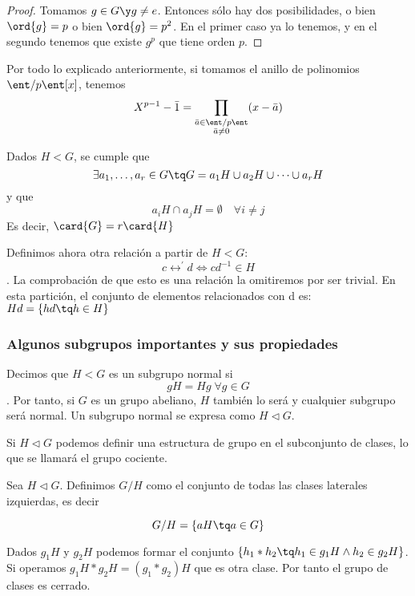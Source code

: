 \documentclass[nochap]{apuntes}
\begin{document}
  \begin{proof}
   Tomamos $g\in G \y g\neq e$. Entonces sólo hay dos posibilidades, o bien $\ord{g}=p$ o bien $\ord{g}=p^{2}$. En el primer caso ya lo tenemos, y en el segundo tenemos que existe $g^p$ que tiene orden $p$.
  \end{proof}

  \begin{example}
   Por todo lo explicado anteriormente, si tomamos el anillo de polinomios $\ent/p\ent[x]$, tenemos \[ X^{p-1}-\bar{1}=
   \prod_{\substack{\bar{a}\in\ent/p\ent \\ \bar{a}\neq 0}}(x-\bar{a}) \]
  \end{example}

  \begin{theorem}
   Dados $H<G$,  se cumple que \[ \exists a_{1},\dotsc,a_{r}\in G\tq G=a_{1}H \cup a_{2}H \cup \dotsb \cup a_{r}H\] y que \[ a_{i}H\cap a_{j}H=\emptyset \quad \forall i\neq j\]
   Es decir, $\card{G}=r\card{H}$
  \end{theorem}

  Definimos ahora otra relación a partir de $H<G$: \[ c\rel^{'}d \Leftrightarrow cd^{-1}\in H \]. La comprobación de que esto es una relación
  la omitiremos por ser trivial. En esta partición, el conjunto de elementos relacionados con d es: $Hd=\{hd\tq h\in H\}$

\subsubsection{Algunos subgrupos importantes y sus propiedades}
  \begin{defn}
   Decimos que $H<G$  es un subgrupo normal si \[ gH=Hg \; \forall g \in G \]. Por tanto, si $G$ es un grupo abeliano, $H$ también lo será y cualquier  subgrupo será normal. Un subgrupo normal se expresa como $H\lhd G$.
  \end{defn}

  Si $H\lhd G$  podemos definir una estructura de grupo en el subconjunto de clases, lo que se llamará el grupo cociente.

  \begin{defn} Sea $H \lhd G$. Definimos $G / H$ como el conjunto de todas las clases laterales izquierdas, es decir

  \[ G/H = \{ aH \tq a \in G\} \]
  \end{defn}


  Dados $g_{1}H$  y $g_{2}H$  podemos formar el conjunto $\{h_{1}\ast h_{2}\tq h_{1}\in g_{1}H \wedge h_{2}\in g_{2}H\}$. Si operamos   $g_{1}H\ast g_{2}H=(g_{1}\ast g_{2})H$  que es otra clase. Por tanto el grupo de clases es cerrado.
\end{document}
